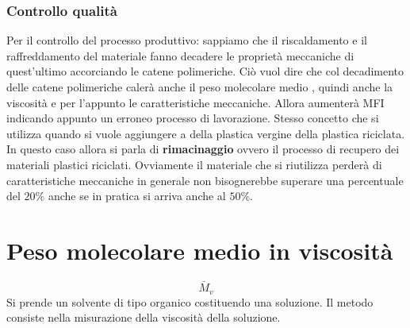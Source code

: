 \subsubsection{Controllo qualità}
Per il controllo del processo produttivo: sappiamo che il riscaldamento e il raffreddamento del materiale fanno decadere le proprietà meccaniche di quest'ultimo accorciando le catene polimeriche. 
Ciò vuol dire che col decadimento delle catene polimeriche calerà anche il peso molecolare medio , quindi anche la viscosità e per l'appunto le caratteristiche meccaniche. Allora aumenterà \ac{MFI} indicando appunto un erroneo processo di lavorazione.
Stesso concetto che si utilizza quando si vuole aggiungere a della plastica vergine della plastica riciclata. In questo caso allora si parla di \textbf{rimacinaggio} ovvero il processo di recupero dei materiali plastici riciclati.
Ovviamente il materiale che si riutilizza perderà di caratteristiche meccaniche in generale non bisognerebbe superare una percentuale del $20\%$ anche se in pratica si arriva anche al $50\%$.

\section{Peso molecolare medio in viscosità}
\begin{equation}
\bar{M}_v
\end{equation}
Si prende un solvente di tipo organico costituendo una soluzione. Il metodo consiste nella misurazione della viscosità della soluzione.

